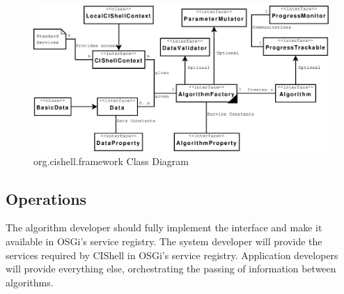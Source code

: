 \begin{figure}[htb!]
\centering
\includegraphics[width=150mm]{../img/cishellInteraction.pdf}
\caption{org.cishell.framework Class Diagram}
\label{fig:cishellInteraction}
\end{figure}

\subsection{Operations}

The algorithm developer should fully implement the 
interface and make it available in OSGi's service registry. The system developer
will provide the services required by CIShell in OSGi's service registry.
Application developers will provide everything else, orchestrating the passing of
information between algorithms.
